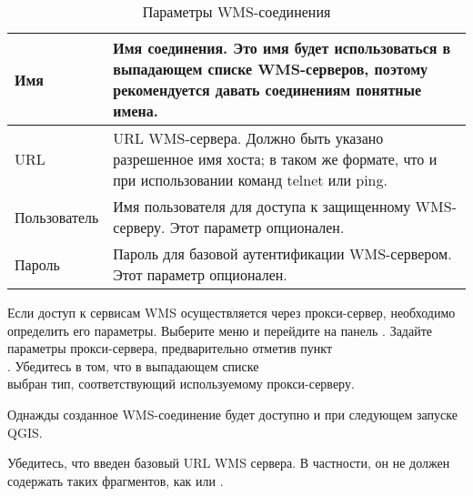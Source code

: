 \begin{table}[ht]
\centering
 \begin{tabular}{|l|p{11cm}|}
\hline Имя & Имя соединения. Это имя будет использоваться в выпадающем
списке WMS-серверов, поэтому рекомендуется давать соединениям понятные имена. \\
\hline URL \index{WMS!URL} & URL WMS-сервера.
 Должно быть указано разрешенное имя хоста; в таком же формате, что и при
 использовании команд telnet или ping. \\
\hline Пользователь \index{WMS!аутентификация} & Имя пользователя для доступа к
 защищенному WMS-серверу. Этот параметр опционален. \\
\hline Пароль & Пароль для базовой аутентификации WMS-сервером. Этот параметр
опционален.\\
\hline
\end{tabular}
\caption{Параметры WMS-соединения}\label{tab:wms_connection_parms}
\end{table}

Если доступ к сервисам WMS осуществляется через прокси-сервер, необходимо
определить его параметры. Выберите меню  \arrow
{} и перейдите на панель . Задайте параметры прокси-сервера, предварительно отметив пункт \\
.
Убедитесь в том, что в выпадающем списке \\
 выбран тип, соответствующий используемому прокси-серверу.

Однажды созданное WMS-соединение будет доступно и при следующем запуске
QGIS.

\begin{Tip}[ht]\caption{\textsc{URL WMS серверов}}
Убедитесь, что введен базовый URL WMS сервера. В частности, он не должен
содержать таких фрагментов, как  или
.
\end{Tip}

